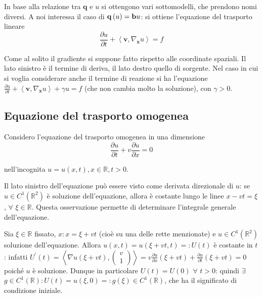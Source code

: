 \documentclass{article}
\begin{document}
In base alla relazione tra $\mathbf{q}$ e $u$ si ottengono vari
sottomodelli, che prendono nomi diversi. A noi interessa il caso di $\mathbf{%
q}\left( u\right) =\mathbf{b}u$: si ottiene l'equazione del trasporto lineare%
\begin{equation*}
\frac{\partial u}{\partial t}+\left\langle \mathbf{v},\nabla _{\mathbf{x}%
}u\right\rangle =f
\end{equation*}

Come al solito il gradiente si suppone fatto rispetto alle coordinate
spaziali. Il lato sinistro \`{e} il termine di deriva, il lato destro quello
di sorgente. Nel caso in cui si voglia considerare anche il termine di
reazione si ha l'equazione $\frac{\partial u}{\partial t}+\left\langle 
\mathbf{v},\nabla _{\mathbf{x}}u\right\rangle +\gamma u=f$ (che non cambia
molto la soluzione), con $\gamma >0$.

\subsection{Equazione del trasporto omogenea}

Considero l'equazione del trasporto omogenea in una dimensione%
\begin{equation*}
\frac{\partial u}{\partial t}+v\frac{\partial u}{\partial x}=0
\end{equation*}

nell'incognita $u=u\left( x,t\right) ,x\in 
\mathbb{R}
,t>0$.

Il lato sinistro dell'equazione pu\`{o} essere visto come derivata
direzionale di $u$: se $u\in C^{1}\left( 
\mathbb{R}
^{2}\right) $ \`{e} soluzione dell'equazione, allora \`{e} costante lungo le
linee $x-vt=\xi $, $\forall $ $\xi \in 
\mathbb{R}
$. Questa osservazione permette di determinare l'integrale generale
dell'equazione.

Sia $\xi \in 
\mathbb{R}
$ fissato, $x:x=\xi +vt$ (cio\`{e} su una delle rette menzionate) e $u\in
C^{1}\left( 
\mathbb{R}
^{2}\right) $ soluzione dell'equazione. Allora $u\left( x,t\right) =u\left(
\xi +vt,t\right) =:U\left( t\right) $ \`{e} costante in $t$: infatti $%
U^{\prime }\left( t\right) =\left\langle \nabla u\left( \xi +vt\right)
,\left( 
\begin{array}{c}
v \\ 
1%
\end{array}%
\right) \right\rangle =v\frac{\partial u}{\partial x}\left( \xi +vt\right) +%
\frac{\partial u}{\partial t}\left( \xi +vt\right) =0$ poich\'{e} $u$ \`{e}
soluzione. Dunque in particolare $U\left( t\right) =U\left( 0\right) $ $%
\forall $ $t>0$: quindi $\exists $ $g\in C^{1}\left( 
\mathbb{R}
\right) :U\left( t\right) =u\left( \xi ,0\right) =:g\left( \xi \right) \in
C^{1}\left( 
\mathbb{R}
\right) $, che ha il significato di condizione iniziale.
\end{document}
